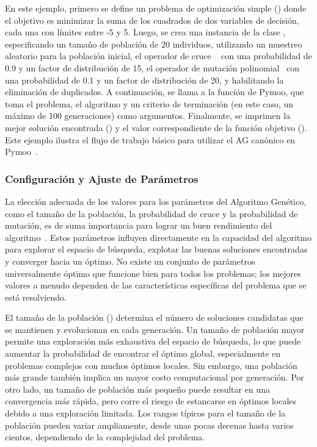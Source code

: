 En este ejemplo, primero se define un problema de optimización simple (\texttt{}) donde el objetivo es minimizar la suma de los cuadrados de dos variables de decisión, cada una con límites entre -5 y 5. Luego, se crea una instancia de la clase \texttt{}, especificando un tamaño de población de 20 individuos, utilizando un muestreo aleatorio para la población inicial, el operador de cruce \texttt{}~\cite{deb1995} con una probabilidad de 0.9 y un factor de distribución de 15, el operador de mutación polinomial~\cite{deb1996} con una probabilidad de 0.1 y un factor de distribución de 20, y habilitando la eliminación de duplicados. A continuación, se llama a la función \texttt{} de Pymoo, que toma el problema, el algoritmo y un criterio de terminación (en este caso, un máximo de 100 generaciones) como argumentos. Finalmente, se imprimen la mejor solución encontrada (\texttt{}) y el valor correspondiente de la función objetivo (\texttt{}). Este ejemplo ilustra el flujo de trabajo básico para utilizar el AG canónico en Pymoo~\cite{blank2020}.

\subsubsection{Configuración y Ajuste de Parámetros}

La elección adecuada de los valores para los parámetros del Algoritmo Genético, como el tamaño de la población, la probabilidad de cruce y la probabilidad de mutación, es de suma importancia para lograr un buen rendimiento del algoritmo~\cite{eiben2015}. Estos parámetros influyen directamente en la capacidad del algoritmo para explorar el espacio de búsqueda, explotar las buenas soluciones encontradas y converger hacia un óptimo. No existe un conjunto de parámetros universalmente óptimo que funcione bien para todos los problemas; los mejores valores a menudo dependen de las características específicas del problema que se está resolviendo.

El tamaño de la población (\texttt{}) determina el número de soluciones candidatas que se mantienen y evolucionan en cada generación. Un tamaño de población mayor permite una exploración más exhaustiva del espacio de búsqueda, lo que puede aumentar la probabilidad de encontrar el óptimo global, especialmente en problemas complejos con muchos óptimos locales. Sin embargo, una población más grande también implica un mayor costo computacional por generación. Por otro lado, un tamaño de población más pequeño puede resultar en una convergencia más rápida, pero corre el riesgo de estancarse en óptimos locales debido a una exploración limitada. Los rangos típicos para el tamaño de la población pueden variar ampliamente, desde unas pocas decenas hasta varios cientos, dependiendo de la complejidad del problema.

